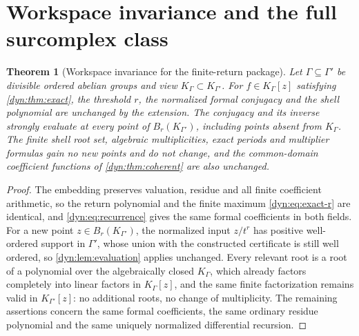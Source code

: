 \documentclass[11pt,letterpaper]{article}
\newtheorem{theorem}{Theorem}[section]
\theoremstyle{definition}
\theoremstyle{remark}
\numberwithin{equation}{section}
\begin{document}
\section{Workspace invariance and the full surcomplex class}
\label{dyn:sec:workspace}

\begin{theorem}[Workspace invariance for the finite-return package]
\label{dyn:thm:workspace}
Let $\Gamma\subseteq\Gamma'$ be divisible ordered abelian groups and view
$K_\Gamma\subset K_{\Gamma'}$. For $f\in K_\Gamma[z]$ satisfying
\cref{dyn:thm:exact}, the threshold $r$, the normalized formal conjugacy
and the shell polynomial are unchanged by the extension. The conjugacy and
its inverse strongly evaluate at every point of $B_r(K_{\Gamma'})$,
including points absent from $K_\Gamma$. The finite shell root set,
algebraic multiplicities, exact periods and multiplier formulas gain no new
points and do not change, and the common-domain coefficient functions of
\cref{dyn:thm:coherent} are also unchanged.
\end{theorem}
\begin{proof}
The embedding preserves valuation, residue and all finite coefficient
arithmetic, so the return polynomial and the finite maximum
\eqref{dyn:eq:exact-r} are identical, and \eqref{dyn:eq:recurrence} gives
the same formal coefficients in both fields. For a new point
$z\in B_r(K_{\Gamma'})$, the normalized input $z/t^{r}$ has positive
well-ordered support in $\Gamma'$, whose union with the constructed
certificate is still well ordered, so \cref{dyn:lem:evaluation} applies
unchanged. Every relevant root is a root of a polynomial over the
algebraically closed $K_\Gamma$, which already factors completely into
linear factors in $K_\Gamma[z]$, and the same finite factorization remains
valid in $K_{\Gamma'}[z]$: no additional roots, no change of multiplicity.
The remaining assertions concern the same formal coefficients, the same
ordinary residue polynomial and the same uniquely normalized differential
recursion.
\end{proof}
\end{document}
